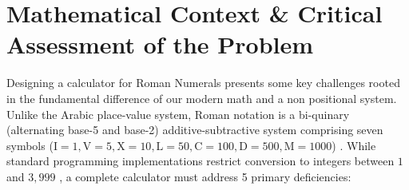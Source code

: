 \documentclass[10pt, a4paper]{article}
\begin{document}
\setcounter{page}{1}


\section{Mathematical Context \& Critical Assessment of the Problem}

Designing a calculator for Roman Numerals presents some key challenges rooted in the fundamental difference of our modern math and a non positional system. \\
Unlike the Arabic place-value system, Roman notation is a bi-quinary (alternating base-5 and base-2) additive-subtractive system comprising seven symbols ($\text{I}=1, \text{V}=5, \text{X}=10, \text{L}=50, \text{C}=100, \text{D}=500, \text{M}=1000$) \cite{lewis2019}. While standard programming implementations restrict conversion to integers between $1$ and $3,999$ \cite{geeksforgeeks2021, steins2022}, a complete calculator must address 5 primary deficiencies:
\end{document}
